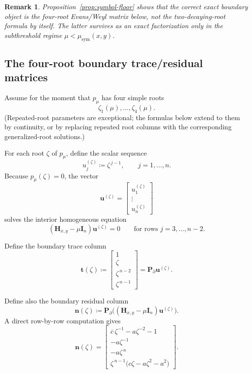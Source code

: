 \documentclass[11pt]{article}
\newtheorem{remark}[theorem]{Remark}
\begin{document}
\begin{remark}
Proposition~\ref{prop:symbol-floor} shows that the correct exact boundary object is the \emph{four-root} Evans/Weyl matrix below, not the two-decaying-root formula by itself. The latter survives as an exact factorization only in the subthreshold regime \(\mu<\mu_{\mathrm{sym}}(x,y)\).
\end{remark}

\subsection*{The four-root boundary trace/residual matrices}

Assume for the moment that \(p_\mu\) has four simple roots
\[
\zeta_1(\mu),\dots,\zeta_4(\mu).
\]
(Repeated-root parameters are exceptional; the formulas below extend to them by continuity, or by replacing repeated root columns with the corresponding generalized-root solutions.)

For each root \(\zeta\) of \(p_\mu\), define the scalar sequence
\[
u_j^{(\zeta)}\coloneqq \zeta^{\,j-1},
\qquad
j=1,\dots,n.
\]
Because \(p_\mu(\zeta)=0\), the vector
\[
\mathbf u^{(\zeta)}=
\begin{bmatrix}
u_1^{(\zeta)}\\
\vdots\\
u_n^{(\zeta)}
\end{bmatrix}
\]
solves the interior homogeneous equation
\[
(\mathbf H_{x,y}-\mu\mathbf I_n)\mathbf u^{(\zeta)}=0
\qquad\text{for rows }j=3,\dots,n-2.
\]

Define the boundary trace column
\[
\mathbf t(\zeta)\coloneqq
\begin{bmatrix}
1\\
\zeta\\
\zeta^{\,n-2}\\
\zeta^{\,n-1}
\end{bmatrix}
=
\mathbf P_\partial \mathbf u^{(\zeta)}.
\]

Define also the boundary residual column
\[
\mathbf n(\zeta)\coloneqq
\mathbf P_\partial
\bigl((\mathbf H_{x,y}-\mu\mathbf I_n)\mathbf u^{(\zeta)}\bigr).
\]
A direct row-by-row computation gives
\[
\mathbf n(\zeta)=
\begin{bmatrix}
\overline c\,\zeta^{-1}-a\zeta^{-2}-1\\[1mm]
-a\zeta^{-1}\\[1mm]
-a\zeta^{\,n}\\[1mm]
\zeta^{\,n-1}\bigl(c\zeta-a\zeta^2-a^2\bigr)
\end{bmatrix}.
\]
\end{document}
